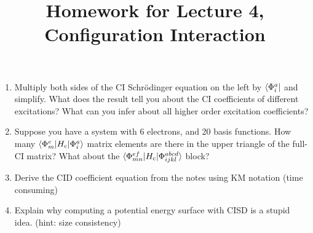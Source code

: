 \documentclass{article}
\title{Homework for Lecture 4, Configuration Interaction}
\date{}
\newcommand{\Hc}{H_{\mathrm{c}}}
\begin{document}
\maketitle
\noindent
\begin{enumerate}
\item Multiply both sides of the CI Schr{\"o}dinger equation on the left by
$\bra{\Phi_i^a}$ and simplify. What does the result tell you
about the CI coefficients of different excitations? What can
you infer about all higher order excitation coefficients?  

\item Suppose you have a system with 6 electrons, and 20 basis functions. How
many $\braket{\Phi_{m}^{e}|\Hc|\Phi_{i}^{a}}$ matrix elements are there
in the upper triangle of the full-CI matrix?
What about the $\braket{\Phi_{mn}^{ef}|\Hc|\Phi_{ijkl}^{abcd}}$ block?

\item Derive the CID coefficient equation from the notes
using KM notation (time consuming)

\item Explain why computing a potential energy surface with CISD
is a stupid idea. (hint: size consistency)
 
\end{enumerate}
\end{document}
